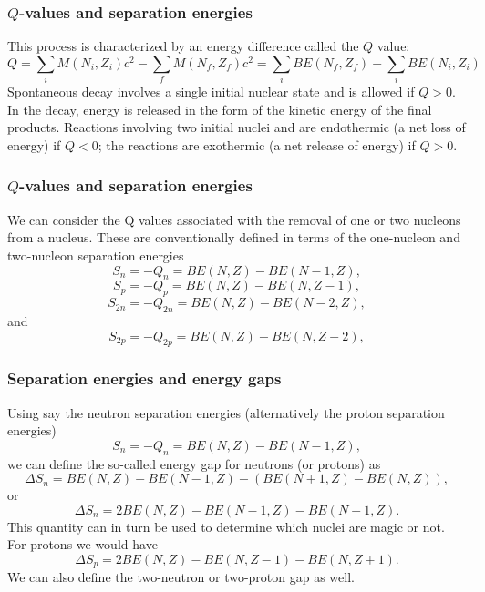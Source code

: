\documentclass[compress]{beamer}
\begin{document}
\frame
{
  \frametitle{$Q$-values and separation energies}
\begin{small}
{\scriptsize
This process is characterized by an energy difference called the $Q$ value:
\[
Q=\sum_iM(N_i, Z_i)c^2-\sum_fM(N_f, Z_f)c^2=\sum_iBE(N_f, Z_f)-\sum_iBE(N_i, Z_i)
\]
Spontaneous decay involves a single initial nuclear state and is allowed if $Q > 0$. In the
decay, energy is released in the form of the kinetic energy of the final products. Reactions
involving two initial nuclei and are endothermic (a net loss of energy) if $Q < 0$; the reactions
are exothermic (a net release of energy) if $Q > 0$.

}
\end{small}
}
\frame
{
  \frametitle{$Q$-values and separation energies}
\begin{small}
{\scriptsize
We can consider the Q values associated with the removal of one or two nucleons from
a nucleus. These are conventionally defined in terms of the one-nucleon and two-nucleon
separation energies
\[
S_n= -Q_n= BE(N,Z)-BE(N-1,Z),
\]
\[
S_p= -Q_p= BE(N,Z)-BE(N,Z-1),
\]
\[
S_{2n}= -Q_{2n}= BE(N,Z)-BE(N-2,Z),
\]
and
\[
S_{2p}= -Q_{2p}= BE(N,Z)-BE(N,Z-2),
\]
}
\end{small}
}

\frame
{
  \frametitle{Separation energies and energy gaps}
\begin{small}
{\scriptsize
Using say the neutron separation energies (alternatively the proton separation energies)
\[
S_n= -Q_n= BE(N,Z)-BE(N-1,Z),
\]
we can define the so-called energy gap for neutrons (or protons) as 
\[
\Delta S_n= BE(N,Z)-BE(N-1,Z)-\left(BE(N+1,Z)-BE(N,Z)\right),
\]
or 
\[
\Delta S_n= 2BE(N,Z)-BE(N-1,Z)-BE(N+1,Z).
\]
This quantity can in turn be used to determine which nuclei are magic or not. 
For protons we would have 
\[
\Delta S_p= 2BE(N,Z)-BE(N,Z-1)-BE(N,Z+1).
\]
We can also define the two-neutron or two-proton gap as well. 
}
\end{small}
}
\end{document}
